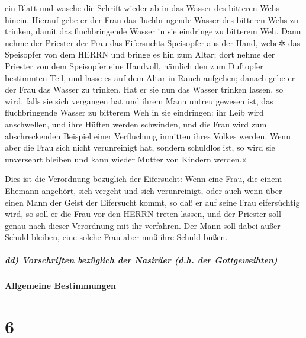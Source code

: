 ein Blatt und wasche die Schrift wieder ab in das Wasser des bitteren
Wehs hinein. Hierauf gebe er der Frau das fluchbringende
Wasser des bitteren Wehs zu trinken, damit das fluchbringende Wasser in
sie eindringe zu bitterem Weh. Dann nehme der Priester
der Frau das Eifersuchts-Speisopfer aus der Hand, webe✲ das Speisopfer
von dem HERRN und bringe es hin zum Altar; dort nehme der
Priester von dem Speisopfer eine Handvoll, nämlich den zum Duftopfer
bestimmten Teil, und lasse es auf dem Altar in Rauch aufgehen; danach
gebe er der Frau das Wasser zu trinken. Hat er sie nun
das Wasser trinken lassen, so wird, falls sie sich vergangen hat und
ihrem Mann untreu gewesen ist, das fluchbringende Wasser zu bitterem Weh
in sie eindringen: ihr Leib wird anschwellen, und ihre Hüften werden
schwinden, und die Frau wird zum abschreckenden Beispiel einer
Verfluchung inmitten ihres Volkes werden. Wenn aber die
Frau sich nicht verunreinigt hat, sondern schuldlos ist, so wird sie
unversehrt bleiben und kann wieder Mutter von Kindern werden.«

Dies ist die Verordnung bezüglich der Eifersucht: Wenn
eine Frau, die einem Ehemann angehört, sich vergeht und sich
verunreinigt, oder auch wenn über einen Mann der Geist
der Eifersucht kommt, so daß er auf seine Frau eifersüchtig wird, so
soll er die Frau vor den HERRN treten lassen, und der Priester soll
genau nach dieser Verordnung mit ihr verfahren. Der Mann
soll dabei außer Schuld bleiben, eine solche Frau aber muß ihre Schuld
büßen.

\hypertarget{dd-vorschriften-bezuxfcglich-der-nasiruxe4er-d.h.-der-gottgeweihten}{%
\subparagraph{dd) Vorschriften bezüglich der Nasiräer (d.h. der
Gottgeweihten)}\label{dd-vorschriften-bezuxfcglich-der-nasiruxe4er-d.h.-der-gottgeweihten}}

\hypertarget{allgemeine-bestimmungen}{%
\paragraph{Allgemeine Bestimmungen}\label{allgemeine-bestimmungen}}

\hypertarget{section-5}{%
\section{6}\label{section-5}}

